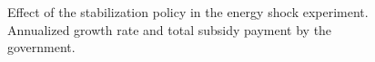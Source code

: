 \begin{figure}[ht!]
\centering\leavevmode
\begin{minipage}{17cm}
\centering\leavevmode
\end{minipage}
\caption{Effect of the stabilization policy in the energy shock experiment. Annualized growth rate and total subsidy payment by the government.}
\label{Figure: Stabilization}
\end{figure}
